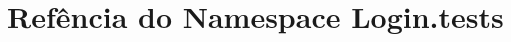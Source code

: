 \hypertarget{namespaceLogin_1_1tests}{\section{Refência do Namespace Login.\-tests}
\label{da/d7b/namespaceLogin_1_1tests}
}
